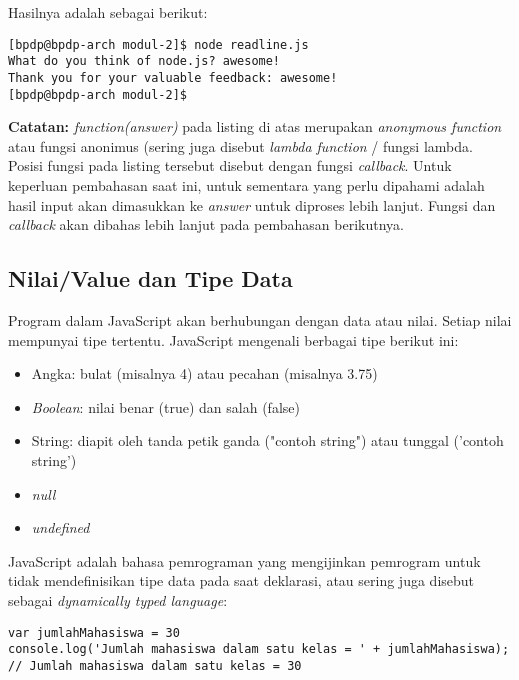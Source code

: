 Hasilnya adalah sebagai berikut:

\lstset{language=bash,caption=Hasil eksekusi readline.js}
\begin{lstlisting}
[bpdp@bpdp-arch modul-2]$ node readline.js 
What do you think of node.js? awesome!
Thank you for your valuable feedback: awesome!
[bpdp@bpdp-arch modul-2]$
\end{lstlisting}


\begin{Sbox}
\begin{minipage}{\textwidth}
\textbf{Catatan:} \textit{function(answer)} pada listing di atas merupakan \textit{anonymous function} atau fungsi anonimus (sering juga disebut \textit{lambda function} / fungsi lambda. Posisi fungsi pada listing tersebut disebut dengan fungsi \textit{callback}. Untuk keperluan pembahasan saat ini, untuk sementara yang perlu dipahami adalah hasil input akan dimasukkan ke \textit{answer} untuk diproses lebih lanjut. Fungsi dan \textit{callback} akan dibahas lebih lanjut pada pembahasan berikutnya.
\end{minipage}
\end{Sbox}
\begin{center}
\shadowbox{\TheSbox}
\end{center}

\subsection{Nilai/Value dan Tipe Data}

Program dalam JavaScript akan berhubungan dengan data atau nilai. Setiap nilai mempunyai tipe tertentu. JavaScript mengenali berbagai tipe berikut ini:
\begin{itemize}
  \item Angka: bulat (misalnya 4) atau pecahan (misalnya 3.75)
  \item \textit{Boolean}: nilai benar (true) dan salah (false)
  \item String: diapit oleh tanda petik ganda ("contoh string") atau tunggal ('contoh string')
  \item \textit{null}
  \item \textit{undefined}
\end{itemize}

JavaScript adalah bahasa pemrograman yang mengijinkan pemrogram untuk tidak mendefinisikan tipe data pada saat deklarasi, atau sering juga disebut sebagai \textit{dynamically typed language}:

\begin{lstlisting}
var jumlahMahasiswa = 30
console.log('Jumlah mahasiswa dalam satu kelas = ' + jumlahMahasiswa);
// Jumlah mahasiswa dalam satu kelas = 30
\end{lstlisting} 

